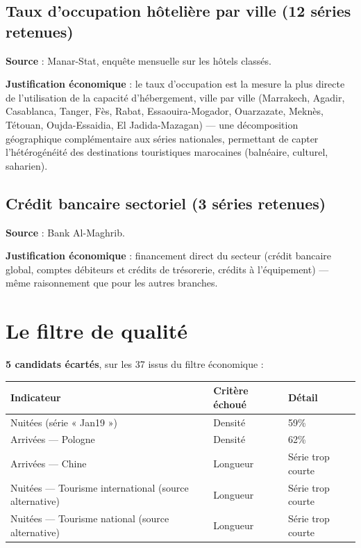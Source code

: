 \documentclass[11pt,a4paper]{article}
\begin{document}
\subsection{Taux d'occupation hôtelière par ville (12 séries retenues)}

\textbf{Source} : Manar-Stat, enquête mensuelle sur les hôtels classés.

\textbf{Justification économique} : le taux d'occupation est la mesure la plus directe de l'utilisation de la capacité d'hébergement, ville par ville (Marrakech, Agadir, Casablanca, Tanger, Fès, Rabat, Essaouira-Mogador, Ouarzazate, Meknès, Tétouan, Oujda-Essaidia, El Jadida-Mazagan) --- une décomposition géographique complémentaire aux séries nationales, permettant de capter l'hétérogénéité des destinations touristiques marocaines (balnéaire, culturel, saharien).

\subsection{Crédit bancaire sectoriel (3 séries retenues)}

\textbf{Source} : Bank Al-Maghrib.

\textbf{Justification économique} : financement direct du secteur (crédit bancaire global, comptes débiteurs et crédits de trésorerie, crédits à l'équipement) --- même raisonnement que pour les autres branches.

\section{Le filtre de qualité}

\begin{fichebox}
\textbf{5 candidats écartés}, sur les 37 issus du filtre économique :

\begin{center}
\small
\begin{tabular}{p{4.5cm}p{3.5cm}p{5cm}}
\toprule
\textbf{Indicateur} & \textbf{Critère échoué} & \textbf{Détail} \\
\midrule
Nuitées (série « Jan19 ») & Densité & 59\% \\
Arrivées --- Pologne & Densité & 62\% \\
Arrivées --- Chine & Longueur & Série trop courte \\
Nuitées --- Tourisme international (source alternative) & Longueur & Série trop courte \\
Nuitées --- Tourisme national (source alternative) & Longueur & Série trop courte \\
\bottomrule
\end{tabular}
\end{center}
\end{fichebox}
\end{document}
